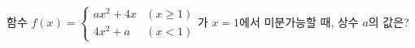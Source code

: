 함수 $f(x)=\begin{cases} ax^2+4x & (x\ge 1) \\ 4x^2+a & (x<1) \end{cases}$가 $x=1$에서 미분가능할 때, 상수 $a$의 값은?
